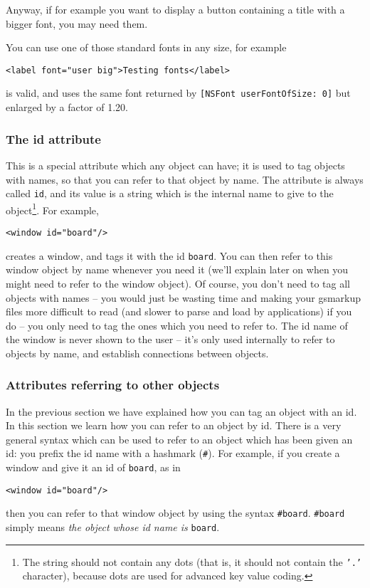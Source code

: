 Anyway, if for example you want to display a button containing a title
with a bigger font, you may need them.

You can use one of those standard fonts in any size, for example
\begin{verbatim}
<label font="user big">Testing fonts</label>
\end{verbatim}
is valid, and uses the same font returned by \texttt{[NSFont
userFontOfSize: 0]} but enlarged by a factor of 1.20.

\subsubsection{The id attribute}
This is a special attribute which any object can have; it is used to
tag objects with names, so that you can refer to that object by name.
The attribute is always called \texttt{id}, and its value is a string
which is the internal name to give to the object\footnote{The string
should not contain any dots (that is, it should not contain the
\texttt{'.'} character), because dots are used for advanced key value
coding.}.  For example,
\begin{verbatim}
<window id="board"/>
\end{verbatim}
creates a window, and tags it with the id \texttt{board}.  You can
then refer to this window object by name whenever you need it (we'll
explain later on when you might need to refer to the window object).
Of course, you don't need to tag all objects with names -- you would
just be wasting time and making your gsmarkup files more difficult to read
(and slower to parse and load by applications) if you do -- you only
need to tag the ones which you need to refer to.  The id name of the
window is never shown to the user -- it's only used internally to
refer to objects by name, and establish connections between objects.

\subsubsection{Attributes referring to other objects}
In the previous section we have explained how you can tag an object
with an id.  In this section we learn how you can refer to an object
by id.  There is a very general syntax which can be used to refer to
an object which has been given an id: you prefix the id name with a
hashmark (\texttt{\#}).  For example, if you create a window and give
it an id of \texttt{board}, as in
\begin{verbatim}
<window id="board"/>
\end{verbatim}
then you can refer to that window object by using the syntax
\texttt{\#board}.  \texttt{\#board} simply means {\it the object whose id name 
is} \texttt{board}.

